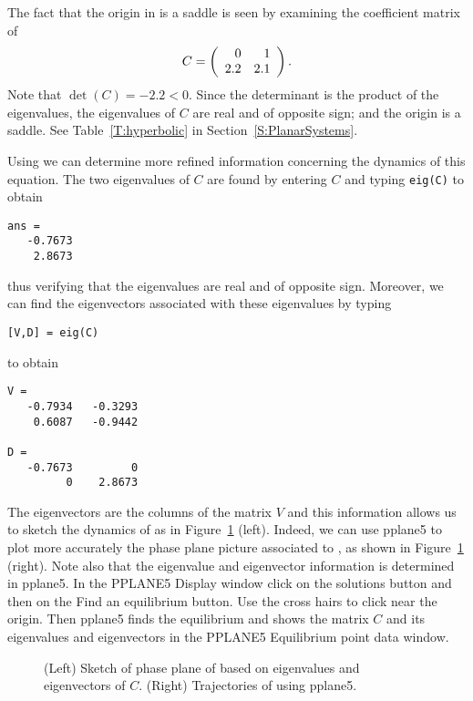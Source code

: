 \documentclass{ximera}
\begin{document}
The fact that the origin in  is a saddle is seen by 
examining the coefficient matrix of 
\[
C = \left(\begin{array}{rr} 0 & 1\\ 2.2 &2.1\end{array}\right).
\]
Note that $\det(C)=-2.2<0$.  Since the determinant is the product 
of the eigenvalues, the eigenvalues of $C$ are real and of opposite 
sign; and the origin is a saddle.  See Table~\ref{T:hyperbolic} in 
Section~\ref{S:PlanarSystems}.

Using \Matlab we can determine more refined information
concerning the dynamics of this equation.  The two eigenvalues
of $C$ are found by entering $C$ and typing {\tt eig(C)}
to obtain
\begin{verbatim}
ans = 
   -0.7673
    2.8673
\end{verbatim}
thus verifying that the eigenvalues are real and of opposite
sign.  Moreover, we can find the eigenvectors
 associated with these eigenvalues by typing
\begin{verbatim}
[V,D] = eig(C)
\end{verbatim}
to obtain
\begin{verbatim}
V = 
   -0.7934   -0.3293
    0.6087   -0.9442
 
D =
   -0.7673         0
         0    2.8673
\end{verbatim} 
The eigenvectors are the columns of the matrix $V$ and this 
information allows us to sketch the dynamics of
 as in Figure~\ref{F:local} (left).  Indeed, we
can use {\sf pplane5} to plot more accurately the phase plane
picture associated to , as shown in
Figure~\ref{F:local} (right).  Note also that the eigenvalue and eigenvector
information is determined in {\sf pplane5}.  In the {\sf PPLANE5 Display}
window click on the {\sf solutions} button and then on the {\sf Find an 
equilibrium} button.  Use the cross hairs to click near the origin.  Then 
{\sf pplane5} finds the equilibrium and shows the matrix $C$ and its eigenvalues
and eigenvectors in the {\sf PPLANE5 Equilibrium point data} window.

\begin{figure}[htb]
           \centerline{%
           }
           \caption{(Left) Sketch of phase plane of \protect{} 
	based on eigenvalues and eigenvectors of $C$. (Right) Trajectories 
	of \protect{} using {\sf pplane5}.}
           \label{F:local}
\end{figure}
\end{document}
